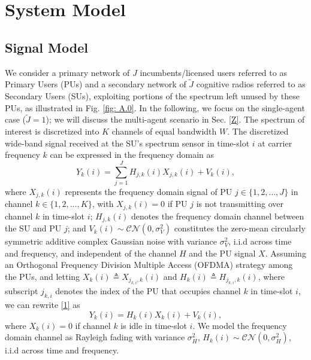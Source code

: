 \documentclass[12pt, draftcls, onecolumn]{IEEEtran}
\begin{document}
\section{System Model}\label{I}
\subsection{Signal Model}\label{I.I}
We consider a primary network of $J$ incumbents/licensed users referred to as Primary Users (PUs) and a secondary network of $\tilde J$ cognitive radios referred to as Secondary Users (SUs),  exploiting portions of the spectrum left unused by these PUs, as illustrated in Fig. \ref{fig: A.0}. In the following, we focus on the single-agent case ($\tilde J=1$); we will discuss the multi-agent scenario in Sec. \ref{Z}. The spectrum of interest is discretized into $K$ channels of equal bandwidth $W$. The discretized wide-band signal received at the SU's spectrum sensor in time-slot $i$ at carrier frequency $k$ can be expressed in the frequency domain as
\begin{equation}\label{1}
    Y_{k}(i)=\sum_{j{=}1}^{J}{H_{j,k}(i)X_{j,k}(i)+V_{k}(i)},
\end{equation}
where $X_{j,k}(i)$ represents the frequency domain signal of PU $j{\in}\{1,2,\dots,J\}$ in channel $k \in \{1,2,\dots,K\}$, with $X_{j,k}(i){=}0$ if PU $j$ is not transmitting over channel $k$ in time-slot $i$; $H_{j,k}(i)$ denotes the frequency domain channel between the SU and PU $j$; and $V_{k}(i){\sim}\mathcal{CN}(0,\sigma_{V}^{2})$ constitutes the zero-mean circularly symmetric additive complex Gaussian noise with variance $\sigma_{V}^{2}$, i.i.d across time and frequency, and independent of the channel $H$ and the PU signal $X$. Assuming an Orthogonal Frequency Division Multiple Access (OFDMA) strategy among the PUs, and letting $X_{k}(i){\triangleq}X_{j_{k,i},k}(i)$ and $H_{k}(i){\triangleq}H_{j_{k,i},k}(i)$, where subscript $j_{k,i}$ denotes the index of the PU that occupies channel $k$ in time-slot $i$, we can rewrite \eqref{1} as
\begin{equation}\label{2}
    Y_{k}(i)=H_{k}(i)X_{k}(i)+V_{k}(i),
\end{equation}
where $X_{k}(i){=}0$ if channel $k$ is idle in time-slot $i$. We model the frequency domain channel as Rayleigh fading with variance $\sigma_{H}^{2}$, $H_{k}(i) \sim \mathcal{CN}(0,\sigma_{H}^{2})$, i.i.d across time and frequency.
\end{document}
